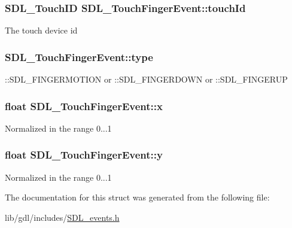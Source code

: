 \subsubsection[{touch\+Id}]{\setlength{\rightskip}{0pt plus 5cm}S\+D\+L\+\_\+\+Touch\+I\+D S\+D\+L\+\_\+\+Touch\+Finger\+Event\+::touch\+Id}\label{struct_s_d_l___touch_finger_event_ad7a6f39ec9af1bf47b160d18314edd70}
The touch device id \hypertarget{struct_s_d_l___touch_finger_event_a3883218fa3426065ca66086c100edbfa}{}
\subsubsection[{type}]{ S\+D\+L\+\_\+\+Touch\+Finger\+Event\+::type}\label{struct_s_d_l___touch_finger_event_a3883218fa3426065ca66086c100edbfa}
\+::\+S\+D\+L\+\_\+\+F\+I\+N\+G\+E\+R\+M\+O\+T\+I\+O\+N or \+::\+S\+D\+L\+\_\+\+F\+I\+N\+G\+E\+R\+D\+O\+W\+N or \+::\+S\+D\+L\+\_\+\+F\+I\+N\+G\+E\+R\+U\+P \hypertarget{struct_s_d_l___touch_finger_event_a0ce44b1342220fa17e9b9b4a77c2c906}{}
\subsubsection[{x}]{\setlength{\rightskip}{0pt plus 5cm}float S\+D\+L\+\_\+\+Touch\+Finger\+Event\+::x}\label{struct_s_d_l___touch_finger_event_a0ce44b1342220fa17e9b9b4a77c2c906}
Normalized in the range 0...1 \hypertarget{struct_s_d_l___touch_finger_event_ac2bb8af638d2927a8e13f6ffe8f9384e}{}
\subsubsection[{y}]{\setlength{\rightskip}{0pt plus 5cm}float S\+D\+L\+\_\+\+Touch\+Finger\+Event\+::y}\label{struct_s_d_l___touch_finger_event_ac2bb8af638d2927a8e13f6ffe8f9384e}
Normalized in the range 0...1 

The documentation for this struct was generated from the following file\+:\begin{DoxyCompactItemize}
\item 
lib/gdl/includes/\hyperlink{_s_d_l__events_8h}{S\+D\+L\+\_\+events.\+h}\end{DoxyCompactItemize}
